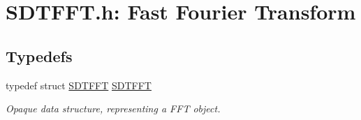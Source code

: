 \hypertarget{group__fft}{}\section{S\+D\+T\+F\+F\+T.\+h\+: Fast Fourier Transform}
\label{group__fft}
\subsection*{Typedefs}
\begin{DoxyCompactItemize}
\item 
\hypertarget{group__fft_ga015ad058ec983e8f92811ba2ab637ab8}{}typedef struct \hyperlink{group__fft_ga015ad058ec983e8f92811ba2ab637ab8}{S\+D\+T\+F\+F\+T} \hyperlink{group__fft_ga015ad058ec983e8f92811ba2ab637ab8}{S\+D\+T\+F\+F\+T}\label{group__fft_ga015ad058ec983e8f92811ba2ab637ab8}

\begin{DoxyCompactList}\small\item\em Opaque data structure, representing a F\+F\+T object. \end{DoxyCompactList}\end{DoxyCompactItemize}
